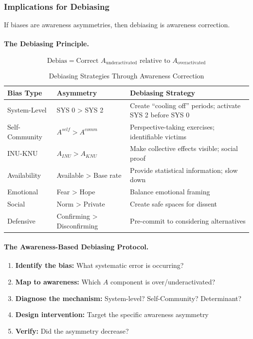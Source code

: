 \subsubsection{Implications for Debiasing}

If biases are awareness asymmetries, then debiasing is awareness correction.

\paragraph{The Debiasing Principle.}
\begin{equation}
\text{Debias} = \text{Correct } A_{\text{underactivated}} \text{ relative to } A_{\text{overactivated}}
\end{equation}

\begin{table}[htbp]
\centering
\caption{Debiasing Strategies Through Awareness Correction}
\label{tab:debiasing}
\renewcommand{\arraystretch}{1.4}
\begin{tabular}{@{}lll@{}}
\toprule
\textbf{Bias Type} & \textbf{Asymmetry} & \textbf{Debiasing Strategy} \\
\midrule
System-Level & SYS 0 > SYS 2 & Create ``cooling off'' periods; activate SYS 2 before SYS 0 \\
Self-Community & $A^{self} > A^{comm}$ & Perspective-taking exercises; identifiable victims \\
INU-KNU & $A_{INU} > A_{KNU}$ & Make collective effects visible; social proof \\
Availability & Available > Base rate & Provide statistical information; slow down \\
Emotional & Fear > Hope & Balance emotional framing \\
Social & Norm > Private & Create safe spaces for dissent \\
Defensive & Confirming > Disconfirming & Pre-commit to considering alternatives \\
\bottomrule
\end{tabular}
\end{table}

\paragraph{The Awareness-Based Debiasing Protocol.}
\begin{enumerate}
\item \textbf{Identify the bias:} What systematic error is occurring?
\item \textbf{Map to awareness:} Which $A$ component is over/underactivated?
\item \textbf{Diagnose the mechanism:} System-level? Self-Community? Determinant?
\item \textbf{Design intervention:} Target the specific awareness asymmetry
\item \textbf{Verify:} Did the asymmetry decrease?
\end{enumerate}

